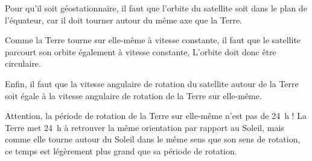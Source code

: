 \documentclass{cours}
\begin{document}
Pour qu'il soit géostationnaire, il faut que l'orbite du satellite soit dans le plan de l'équateur, car il doit tourner autour du même axe que la Terre. 

Comme la Terre tourne sur elle-même à vitesse constante, il faut que le satellite parcourt son orbite également à vitesse constante, L'orbite doit donc être circulaire.

Enfin, il faut que la vitesse angulaire de rotation du satellite autour de la Terre soit égale à la vitesse angulaire de rotation de la Terre sur elle-même. 

Attention, la période de rotation de la Terre sur elle-même n'est pas de \SI{24}{\hour} ! La Terre met \SI{24}{\hour} à retrouver la même orientation par rapport au Soleil, mais comme elle tourne autour du Soleil dans le même sens que son sens de rotation, ce temps est légèrement plus grand que sa période de rotation.
\begin{center}
\end{center}
\end{document}
